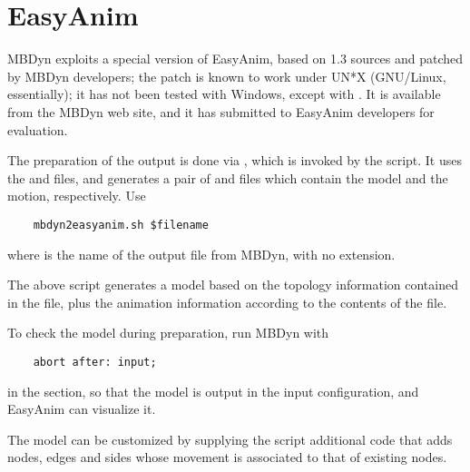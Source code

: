 \section{EasyAnim}
\label{sec:APP:OUTPUTRESULTS:EASYANIM}
MBDyn exploits a special version of EasyAnim, based on 1.3 sources
and patched by MBDyn developers; the patch is known to work under UN*X
(GNU/Linux, essentially); it has not been tested with Windows, except with
.
It is available from the MBDyn web site, and it has submitted to EasyAnim
developers for evaluation.

The preparation of the output is done via , which is invoked
by the  script.
It uses the  and  files, and generates a pair of
 and  files which contain the model and the motion,
respectively.
Use
\begin{verbatim}
    mbdyn2easyanim.sh $filename
\end{verbatim}
where  is the name of the output file from MBDyn,
with no extension.

The above script generates a model based on the topology information
contained in the  file, plus the animation information
according to the contents of the  file.

To check the model during preparation, run MBDyn with
\begin{verbatim}
    abort after: input;
\end{verbatim}
in the  section, so that the model is output 
in the input configuration, and EasyAnim can visualize it.

The model can be customized by supplying the 
script additional  code that adds nodes, edges and sides 
whose movement is associated to that of existing nodes.

